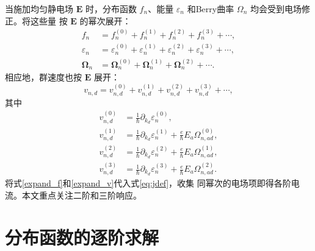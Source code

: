 当施加均匀静电场 \(\mathbf{E}\) 时，分布函数 \(f_n\)、能量
\(\varepsilon_n\) 和Berry曲率 \(\Omega_n\) 均会受到电场修正。将这些量
按 \(\mathbf{E}\) 的幂次展开：
\begin{align}
  f_n   &= f_n^{(0)} + f_n^{(1)} + f_n^{(2)} + f_n^{(3)} + \cdots, \label{expand_f}\\
  \varepsilon_n &= \varepsilon_n^{(0)} + \varepsilon_n^{(1)}
                 + \varepsilon_n^{(2)} + \varepsilon_n^{(3)} + \cdots, \label{expand_eps}\\
  \bm{\Omega}_n &= \bm{\Omega}_n^{(0)} + \bm{\Omega}_n^{(1)}
                + \bm{\Omega}_n^{(2)} + \cdots . \label{expand_Omega}
\end{align}
相应地，群速度也按 \(\mathbf{E}\) 展开：
\begin{equation}
  v_{n,d} = v_{n,d}^{(0)} + v_{n,d}^{(1)} + v_{n,d}^{(2)} + v_{n,d}^{(3)} + \cdots,
  \label{expand_v}
\end{equation}
其中
\begin{align}
  v_{n,d}^{(0)} &= \frac{1}{\hbar}\partial_{k_d}\varepsilon_n^{(0)}, \label{v0}\\
  v_{n,d}^{(1)} &= \frac{1}{\hbar}\partial_{k_d}\varepsilon_n^{(1)}
                  + \frac{e}{\hbar}E_a\Omega_{n,ad}^{(0)}, \label{v1}\\
  v_{n,d}^{(2)} &= \frac{1}{\hbar}\partial_{k_d}\varepsilon_n^{(2)}
                  + \frac{e}{\hbar}E_a\Omega_{n,ad}^{(1)}, \label{v2}\\
  v_{n,d}^{(3)} &= \frac{1}{\hbar}\partial_{k_d}\varepsilon_n^{(3)}
                  + \frac{e}{\hbar}E_a\Omega_{n,ad}^{(2)}. \label{v3}
\end{align}
将式\eqref{expand_f}和\eqref{expand_v}代入式\eqref{eq:jdef}，收集
同幂次的电场项即得各阶电流。本文重点关注二阶和三阶响应。

\section{分布函数的逐阶求解}


